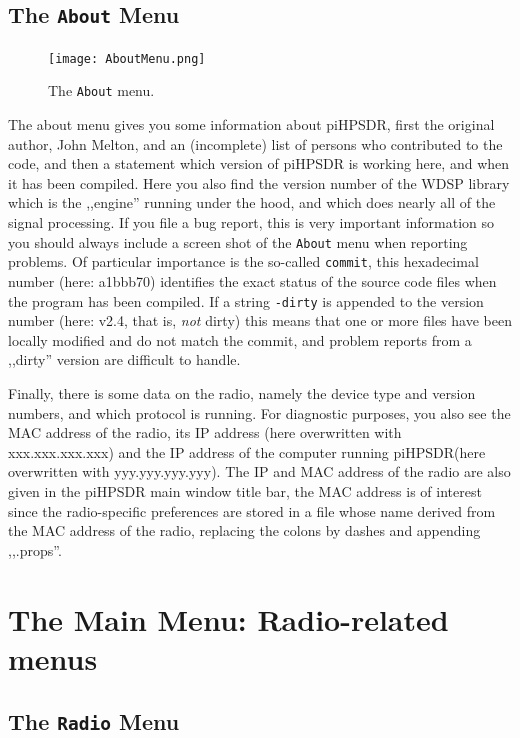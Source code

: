 \documentclass[12pt]{book}
\def\rett#1{\texttt{\color{red}#1}}
\def\bltt#1{\texttt{\color{blue}#1}}
\def\pH{pi\-HPSDR\xspace}
\begin{document}
\section{The \texttt{About} Menu}

\begin{figure}[ht]
\center
\texttt{[image: AboutMenu.png]}
\caption{The \bltt{About} menu.}
\end{figure}

The about menu gives you some information about \pH, first the original author,
John Melton,
and an (incomplete) list
of persons who contributed to the code, and then a statement which version of \pH
is working here, and when it has been compiled. Here you also find the version number of the WDSP
library which is the ,,engine''
running under the hood, and which does nearly all of the signal processing. If you file a bug report,
this is very important information so you should always include a screen shot of the \bltt{About}
menu when reporting problems. Of particular importance is the so-called \rett{commit},
this hexadecimal number (here: a1bbb70) identifies the exact status of the source code files
when the program has been compiled. If a string \texttt{-dirty} is appended to the version number
(here: v2.4, that is, \textit{not} dirty) this means that one or more files have been locally  modified
and do not match the commit, and problem reports from a ,,dirty'' version are difficult to handle.

Finally, there is
some data on the radio, namely the device type and version numbers, and which protocol is running.
For diagnostic purposes, you also see the MAC address of the radio, its IP address (here overwritten
with xxx.xxx.xxx.xxx)
and the
IP address of the computer running \pH (here overwritten with yyy.yyy.yyy.yyy). The IP and MAC address of
the radio are also given in the \pH main window title bar, the MAC address is of interest since the radio-specific
preferences are stored in a file whose name derived from the MAC address of the radio, replacing
the colons by dashes and appending ,,.props''.
\chapter[Radio-related menus]{The Main Menu: Radio-related menus}
\section{The \texttt{Radio} Menu}
\end{document}
